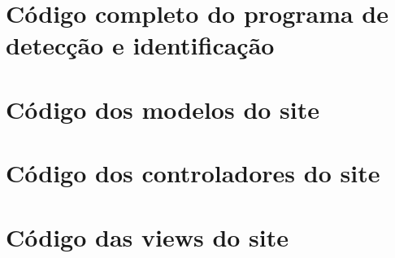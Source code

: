 
\begin{apendicesenv}
\partapendices

\chapter{Código completo do programa de detecção e identificação}
\label{chap:apendiceCodigo}



\chapter{Código dos modelos do site}
\label{chap:apendiceSiteModels}








\chapter{Código dos controladores do site}
\label{chap:apendiceSiteControlador}










\chapter{Código das views do site}
\label{chap:apendiceSiteViews}


\end{apendicesenv}
